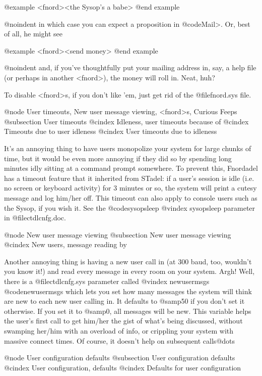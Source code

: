 {{{@example
<fnord><the Sysop's a babe>
@end example

@noindent
in which case you can expect a proposition in @code{Mail>}.  Or, best of
all, he might see

@example
<fnord><send money>
@end example

@noindent
and, if you've thoughtfully put your mailing address in, say, a
help file (or perhaps in another <fnord>), the money will roll in.
Neat, huh?

To disable <fnord>s, if you don't like 'em, just get rid
of the @file{fnord.sys} file.

@node User timeouts, New user message viewing, <fnord>s, Curious Feeps
@subsection User timeouts
@cindex Idleness, user timeouts because of
@cindex Timeouts due to user idleness
@cindex User timeouts due to idleness

It's an annoying thing to have users monopolize your system
for large chunks of time, but it would be even more annoying if they
did so by spending long minutes idly sitting at a command prompt
somewhere.  To prevent this, Fnordadel has a timeout feature that
it inherited from STadel: if a user's session is idle (i.e. no screen
or keyboard activity) for 3 minutes or so, the system will print a
cutesy message and log him/her off.  This timeout can also apply to
console users such as the Sysop, if you wish it.  See the @code{sysopsleep}
@vindex sysopsleep
parameter in @file{ctdlcnfg.doc}.

@node New user message viewing
@subsection New user message viewing
@cindex New users, message reading by

Another annoying thing is having a new user call in (at 300
baud, too, wouldn't you know it!) and read every message in every room
on your system.  Argh!  Well, there is a @file{ctdlcnfg.sys} parameter called
@vindex newusermsgs
@code{newusermsgs} which lets you set how many messages the system will
think are new to each new user calling in.  It defaults to @samp{50} if you
don't set it otherwise.  If you set it to @samp{0}, all messages will be new.
This variable helps the user's first call to get him/her the gist of what's
being discussed, without swamping her/him with an overload of info, or
crippling your system with massive connect times.  Of course, it
doesn't help on subsequent calls@dots{}

@node User configuration defaults
@subsection User configuration defaults
@cindex User configuration, defaults
@cindex Defaults for user configuration

}}}
